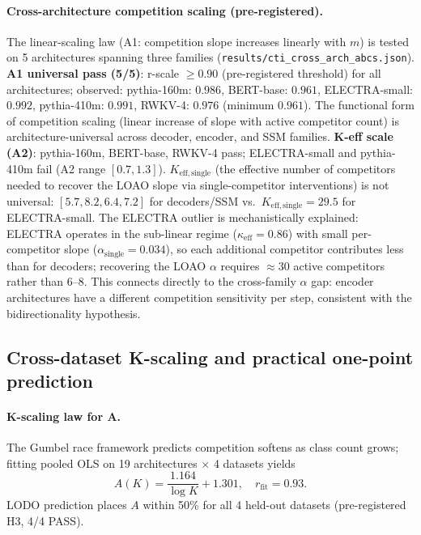 \documentclass{article}
\begin{document}
\paragraph{Cross-architecture competition scaling (pre-registered).}
The linear-scaling law (A1: competition slope increases linearly with $m$) is tested on 5 architectures spanning three families (\texttt{results/cti\_cross\_arch\_abcs.json}).
\textbf{A1 universal pass (5/5)}: r-scale $\geq 0.90$ (pre-registered threshold) for all architectures; observed: pythia-160m: $0.986$, BERT-base: $0.961$, ELECTRA-small: $0.992$, pythia-410m: $0.991$, RWKV-4: $0.976$ (minimum $0.961$).
The functional form of competition scaling (linear increase of slope with active competitor count) is architecture-universal across decoder, encoder, and SSM families.
\textbf{K-eff scale (A2)}: pythia-160m, BERT-base, RWKV-4 pass; ELECTRA-small and pythia-410m fail (A2 range $[0.7,1.3]$).
$K_\mathrm{eff,single}$ (the effective number of competitors needed to recover the LOAO slope via single-competitor interventions) is not universal: $[5.7, 8.2, 6.4, 7.2]$ for decoders/SSM vs.\ $K_\mathrm{eff,single}=29.5$ for ELECTRA-small.
The ELECTRA outlier is mechanistically explained: ELECTRA operates in the sub-linear regime ($\kappa_{\mathrm{eff}}=0.86$) with small per-competitor slope ($\alpha_\mathrm{single}=0.034$), so each additional competitor contributes less than for decoders; recovering the LOAO $\alpha$ requires $\approx30$ active competitors rather than 6--8.
This connects directly to the cross-family $\alpha$ gap: encoder architectures have a different competition sensitivity per step, consistent with the bidirectionality hypothesis.

\subsection{Cross-dataset K-scaling and practical one-point prediction}
\label{sec:kdataset}

\paragraph{K-scaling law for A.}
The Gumbel race framework predicts competition softens as class count grows; fitting pooled OLS on 19 architectures $\times$ 4 datasets yields
\begin{equation}
A(K) = \frac{1.164}{\log K} + 1.301,\quad r_\mathrm{fit}=0.93.
\label{eq:ak}
\end{equation}
LODO prediction places $A$ within 50\% for all 4 held-out datasets (pre-registered H3, 4/4 PASS).
\end{document}
